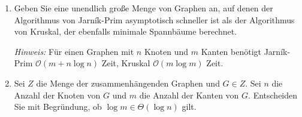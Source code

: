 \documentclass{bschlangaul-aufgabe}
\begin{document}
\begin{enumerate}
\begin{bAntwort}
\begin{multicols}{2}


\end{multicols}
\end{bAntwort}


\item Geben Sie eine unendlich große Menge von Graphen an, auf denen der
Algorithmus von Jarník-Prim asymptotisch schneller ist als der
Algorithmus von Kruskal, der ebenfalls minimale Spannbäume berechnet.

\emph{Hinweis:} Für einen Graphen mit $n$ Knoten und $m$ Kanten benötigt
Jarník-Prim $\mathcal{O}(m + n \log n)$ Zeit, Kruskal $\mathcal{O}(m
\log m)$ Zeit.


\item Sei $Z$ die Menge der zusammenhängenden Graphen und $G \in Z$. Sei
$n$ die Anzahl der Knoten von $G$ und $m$ die Anzahl der Kanten von $G$.
Entscheiden Sie mit Begründung, ob $\log m \in \Theta(\log n)$ gilt.

\end{enumerate}
\end{document}

